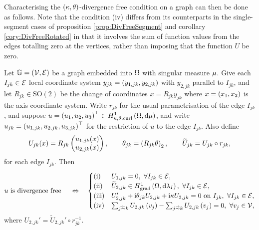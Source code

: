 Characterising the $\left( \kappa, \theta \right)$-divergence free condition on a graph can then be done as follows.
Note that the condition (iv) differs from its counterparts in the single-segment cases of proposition \ref{prop:DivFreeSegment} and corollary \ref{cory:DivFreeRotated} in that it involves the sum of function values from the edges totalling zero at the vertices, rather than imposing that the function $U$ be zero.
\begin{theorem} \label{thm:DivFreeEdgesCharacterisation}
	Let $\mathbb{G}=\left( \mathcal{V}, \mathcal{E} \right)$ be a graph embedded into $\Omega$ with singular measure $\mu$.
	Give each $I_{jk}\in\mathcal{E}$ local coordinate system $y_{jk}=\left( y_{1, jk},y_{2, jk} \right)$ with $y_{2,jk}$ parallel to $I_{jk}$, and let $R_{jk}\in\mathrm{SO}(2)$ be the change of coordinates $x=R_{jk}y_{jk}$ where $x=\left( x_1, x_2 \right)$ is the axis coordinate system.
	Write $r_{jk}$ for the usual parametrisation of the edge $I_{jk}$, and suppose $u=\left( u_1, u_2, u_3 \right)^\top\in H^1_{\kappa,\theta,\mathrm{curl}}\left( \Omega, \mathrm{d}\mu \right)$, and write $u_{jk}=\left( u_{1,jk}, u_{2,jk}, u_{3,jk} \right)^\top$ for the restriction of $u$ to the edge $I_{jk}$.
	Also define
	\begin{align*}
		U_{jk}(x) = R_{jk}\begin{pmatrix} u_{1, jk}(x) \\ u_{2, jk}(x) \end{pmatrix},
		\qquad \theta_{jk} = \left(  R_{jk}\theta  \right)_2,
		\qquad \widetilde{U}_{jk} = U_{jk} \circ r_{jk},
	\end{align*}
	for each edge $I_{jk}$.
	Then
	\begin{align*}
		u \text{ is divergence free } \quad\Leftrightarrow\quad
		\begin{cases}
			\mathrm{(i)} & U_{1, jk} = 0, \ \forall I_{jk}\in\edgeSet, \\
			\mathrm{(ii)} & \widetilde{U}_{2,jk} \in\gradSob{\ddom}{\lambda_I}, \ \forall I_{jk}\in\edgeSet, \\
			\mathrm{(iii)} & U_{2,jk}' + \rmi\qm_{jk} U_{2,jk} + \rmi\wavenumber U_{3,jk} = 0 \text{ on } I_{jk}, \ \forall I_{jk}\in\edgeSet, \\
			\mathrm{(iv)} & \sum_{j\conRight k} U_{2,jk}\bracs{v_j} - \sum_{j\conLeft k} U_{2,jk}\bracs{v_j} = 0, \ \forall v_j\in\vertSet,
		\end{cases}
	\end{align*}
	where $U_{2,jk}' = \widetilde{U}_{2,jk}'\circ r_{jk}^{-1}$.
\end{theorem}
